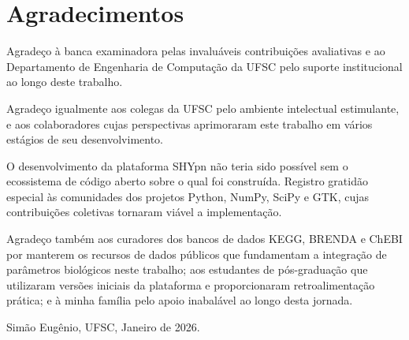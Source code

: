 \chapter*{Agradecimentos}

Agradeço à banca examinadora pelas invaluáveis contribuições avaliativas
e ao Departamento de Engenharia de Computação da UFSC pelo suporte
institucional ao longo deste trabalho.

Agradeço igualmente aos colegas da UFSC pelo ambiente intelectual
estimulante, e aos colaboradores cujas perspectivas aprimoraram este
trabalho em vários estágios de seu desenvolvimento.

O desenvolvimento da plataforma SHYpn não teria sido possível sem
o ecossistema de código aberto sobre o qual foi construída. Registro
gratidão especial às comunidades dos projetos Python, NumPy, SciPy e
GTK, cujas contribuições coletivas tornaram viável a implementação.

Agradeço também aos curadores dos bancos de dados KEGG, BRENDA e
ChEBI por manterem os recursos de dados públicos que fundamentam a
integração de parâmetros biológicos neste trabalho; aos estudantes de
pós-graduação que utilizaram versões iniciais da plataforma e
proporcionaram retroalimentação prática; e à minha família pelo apoio
inabalável ao longo desta jornada.

\vspace{2em}
\noindent Simão Eugênio, UFSC, Janeiro de 2026.
